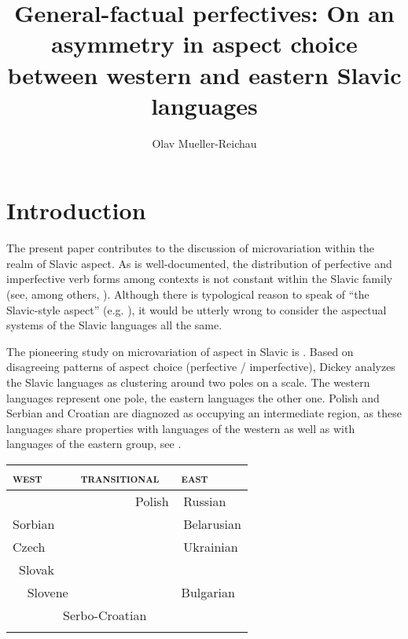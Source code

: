 \documentclass[output=paper,modfonts,newtxmath,hidelinks]{langscibook}
\title{General-factual perfectives: On an asymmetry in aspect choice between western and eastern Slavic languages}
\author{Olav Mueller-Reichau\affiliation{University of Leipzig}}
\begin{document}
\maketitle
{}

\section{Introduction}\label{13:s1} 

The present paper contributes to the discussion of microvariation within the realm of Slavic aspect. 
As is well-documented, the distribution 
of perfective and imperfective verb forms among contexts is not constant within the Slavic family (see, among others, \citealt{Stunova1991,Stunova1993,Breu2000ZurPositiondes,Petruchina2000,Dickey2000,Dickey15,Dickey18,Gehrke02,Wiemer08,Rivero10,Alvestad13,Gattnar13,Berger13,Rivero14,Duebbers15,FK15,FK18}).
Although there is typological reason to speak of ``the Slavic-style aspect'' (e.g. \citealt{Dahl85,Plungjan11}),
it would be utterly wrong to consider the aspectual systems of the Slavic languages all the same. 

The pioneering study on microvariation of aspect in Slavic is \citet{Dickey2000}. Based on disagreeing patterns of aspect choice (perfective / imperfective),
Dickey analyzes the Slavic languages as clustering around two poles on a scale. The western languages represent one pole, the eastern languages the other one. 
Polish and Serbian and Croatian are diagnozed as occupying an intermediate region, as these languages share properties with languages of the western as well as with 
languages of the eastern group, see .




\begin{table}
\centering
      \label{13:sd1}
      \begin{tabularx}{0.6\textwidth}{l l l}
\lsptoprule \textsc{west} & \textsc{transitional} & \textsc{east}\\
\midrule     &  $\quad\quad\quad\quad$ Polish & $\,$Russian \\
   Sorbian  &    & $\,$Belarusian \\
    Czech  &    &  $\,$Ukrainian\\ 
  $\,$  Slovak  &    &  \\
   $\,\,\,\,\,$  Slovene  &    & Bulgarian \\
        \multicolumn{2}{l}{$\quad\quad\quad\quad$Serbo-Croatian} & \\
\lspbottomrule
\end{tabularx}
\end{table}
\end{document}
